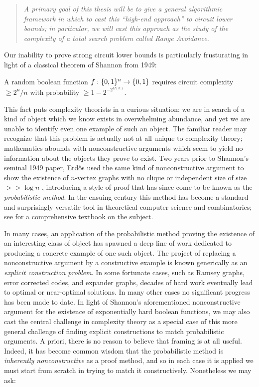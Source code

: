 \begin{quote}
    \textit{A primary goal of this thesis will be to give a general algorithmic framework in which to cast this ``high-end approach'' to circuit lower bounds; in particular, we will cast this approach as the study of the complexity of a total search problem called Range Avoidance.}
\end{quote}

Our inability to prove strong circuit lower bounds is particularly frusturating in light of a classical theorem of Shannon from 1949:
\begin{theorem*}
A random boolean function $f: \{0,1\}^n \to \{0,1\}$ requires circuit complexity $\geq 2^{n}/n$ with probability $\geq 1 - 2^{-2^{\Omega(n)}}$.
\end{theorem*}
This fact puts complexity theorists in a curious situation: we are in search of a kind of object which we know exists in overwhelming abundance, and yet we are unable to identify even one example of such an object. The familiar reader may recognize that this problem is actually not at all unique to complexity theory; mathematics abounds with nonconstructive arguments which seem to yield no information about the objects they prove to exist. Two years prior to Shannon's seminal 1949 paper, Erd\H{o}s used the same kind of nonconstructive argument to show the existence of $n$-vertex graphs with no clique or independent size of size $>> \log n$ \cite{Erdos}, introducing a style of proof that has since come to be known as the \emph{probabilistic method}. In the ensuing century this method has become a standard and surprisingly versatile tool in theoretical computer science and combinatorics; see \cite{probabilistic-method} for a comprehensive textbook on the subject. 

In many cases, an application of the probabilistic method proving the existence of an interesting class of object has spawned a deep line of work dedicated to producing a concrete example of one such object. The project of replacing a nonconstructive argument by a constructive example is known generically as an \emph{explicit construction problem}. In some fortunate cases, such as Ramsey graphs, error corrected codes, and expander graphs, decades of hard work eventually lead to optimal or near-optimal solutions. In many other cases no significant progress has been made to date. 
In light of Shannon's aforementioned nonconstructive argument for the existence of exponentially hard boolean functions, we may also cast the central challenge in complexity theory as a special case of this more general challenge of finding explicit constructions to match probabilistic arguments. A priori, there is no reason to believe that framing is at all useful. Indeed, it has become common wisdom that the probabilistic method is \emph{inherently nonconstructive} as a proof method, and so in each case it is applied we must start from scratch in trying to match it constructively. Nonetheless we may ask:

